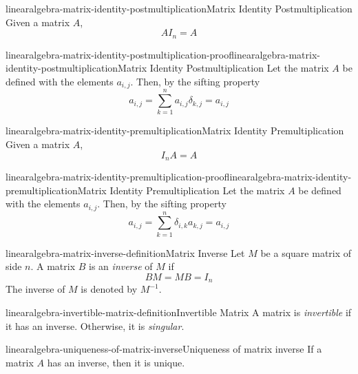 \documentclass[preview]{standalone}
\begin{document}
\begin{snippetproposition}{linearalgebra-matrix-identity-postmultiplication}{Matrix Identity Postmultiplication}
    Given a matrix \(A\),
    \[ AI_n=A \]
\end{snippetproposition}

\begin{snippetproof}{linearalgebra-matrix-identity-postmultiplication-proof}{linearalgebra-matrix-identity-postmultiplication}{Matrix Identity Postmultiplication}
    Let the matrix \(A\) be defined with the
    elements \(a_{i,j}\).
    Then, by the sifting property %
    \[
        a_{i,j} = \sum_{k=1}^n
        a_{i,j}\delta_{k,j} = a_{i,j}
    \]
\end{snippetproof}

\begin{snippetproposition}{linearalgebra-matrix-identity-premultiplication}{Matrix Identity Premultiplication}
    Given a matrix \(A\),
    \[ I_n A=A \]
\end{snippetproposition}

\begin{snippetproof}{linearalgebra-matrix-identity-premultiplication-proof}{linearalgebra-matrix-identity-premultiplication}{Matrix Identity Premultiplication}
    Let the matrix \(A\) be defined with the
    elements \(a_{i,j}\).
    Then, by the sifting property %
    \[
        a_{i,j} = \sum_{k=1}^n
        \delta_{i,k}a_{k,j} = a_{i,j}
    \]
\end{snippetproof}

\begin{snippetdefinition}{linearalgebra-matrix-inverse-definition}{Matrix Inverse}
    Let \(M\) be a square matrix of side \(n\).
    A matrix \(B\) is an \textit{inverse}
    of \(M\) if \[BM=MB=I_n\]
    The inverse of \(M\) is denoted by \(M^{-1}\).
\end{snippetdefinition}

\begin{snippetdefinition}{linearalgebra-invertible-matrix-definition}{Invertible Matrix}
    A matrix is \textit{invertible} if it has an inverse.
    Otherwise, it is \textit{singular}.
\end{snippetdefinition}

\begin{snippetproposition}{linearalgebra-uniqueness-of-matrix-inverse}{Uniqueness of matrix inverse}
    If a matrix \(A\) has an inverse, then it is unique.
\end{snippetproposition}
\end{document}
